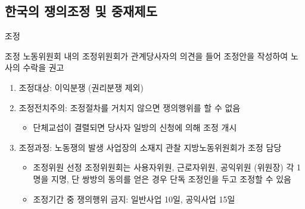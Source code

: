 \documentclass[aspectratio=169,xcolor=dvipsnames,handout]{beamer}
\begin{document}
\subsection{한국의 쟁의조정 및 중재제도}%

\begin{frame}{조정}
    \begin{block}{조정}
        노동위원회 내의 조정위원회가 관계당사자의 의견을 들어 조정안을 작성하여 노사의 수락을 권고
    \end{block}
    \begin{enumerate}[<+->]
        \item 조정대상: 이익분쟁 (권리분쟁 제외)
        \item 조정전치주의: 조정절차를 거치지 않으면 쟁의행위를 할 수 없음
        \begin{itemize}[<+->]
            \item 단체교섭이 결렬되면 당사자 일방의 신청에 의해 조정 개시
        \end{itemize}
        \item 조정과정: 노동쟁의 발생 사업장의 소재지 관찰 지방노동위원회가 조정 담당
        \begin{itemize}[<+->]
            \item 조정위원 선정 조정위원회는 사용자위원, 근로자위원, 공익위원 (위원장) 각 1명을 지명, 단 쌍방의 동의를 얻은 경우 단독 조정인을 두고 조정할 수 있음
            \item 조정기간 중 쟁의행위 금지: 일반사업 10일, 공익사업 15일
        \end{itemize}
    \end{enumerate}
\end{frame}
\end{document}
